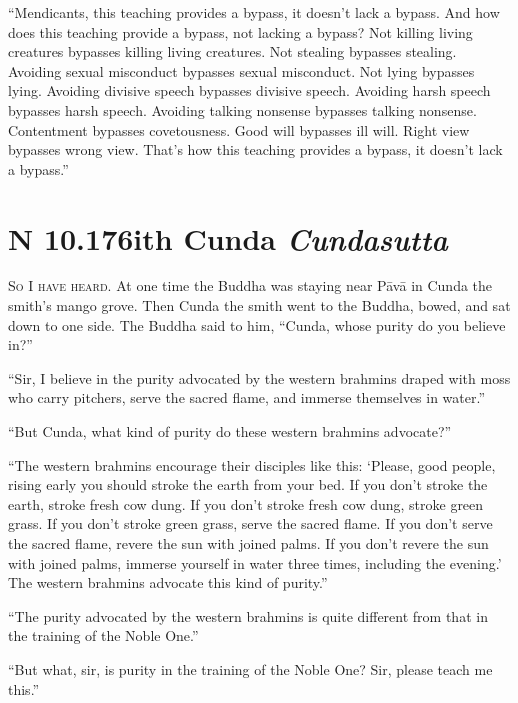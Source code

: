 \documentclass[12pt,openany]{book}%
\newcommand*{\suttatitleacronym}[1]{\smaller[2]{#1}\vspace*{.3em}}
\newcommand*{\suttatitletranslation}[1]{\linebreak{#1}}
\newcommand*{\suttatitleroot}[1]{\linebreak\smaller[2]\itshape{#1}}
\newcommand*{\tocacronym}[1]{\hspace*{-3.3em}{#1}\quad}
\newcommand*{\toctranslation}[1]{#1}
\newcommand*{\tocroot}[1]{(\textit{#1})}
\newcommand*{\scevam}[1]{\textsc{#1}}
\begin{document}
“Mendicants, this teaching provides a bypass, it doesn’t lack a bypass. And how does this teaching provide a bypass, not lacking a bypass? Not killing living creatures bypasses killing living creatures. Not stealing bypasses stealing. Avoiding sexual misconduct bypasses sexual misconduct. Not lying bypasses lying. Avoiding divisive speech bypasses divisive speech. Avoiding harsh speech bypasses harsh speech. Avoiding talking nonsense bypasses talking nonsense. Contentment bypasses covetousness. Good will bypasses ill will. Right view bypasses wrong view. That’s how this teaching provides a bypass, it doesn’t lack a bypass.” 

%
\section*{{\suttatitleacronym AN 10.176}{\suttatitletranslation With Cunda }{\suttatitleroot Cundasutta}}
\addcontentsline{toc}{section}{\tocacronym{AN 10.176} \toctranslation{With Cunda } \tocroot{Cundasutta}}

\scevam{So I have heard. }At one time the Buddha was staying near \textsanskrit{Pāvā} in Cunda the smith’s mango grove. Then Cunda the smith went to the Buddha, bowed, and sat down to one side. The Buddha said to him, “Cunda, whose purity do you believe in?” 

“Sir, I believe in the purity advocated by the western brahmins draped with moss who carry pitchers, serve the sacred flame, and immerse themselves in water.” 

“But Cunda, what kind of purity do these western brahmins advocate?” 

“The western brahmins encourage their disciples like this: ‘Please, good people, rising early you should stroke the earth from your bed. If you don’t stroke the earth, stroke fresh cow dung. If you don’t stroke fresh cow dung, stroke green grass. If you don’t stroke green grass, serve the sacred flame. If you don’t serve the sacred flame, revere the sun with joined palms. If you don’t revere the sun with joined palms, immerse yourself in water three times, including the evening.’ The western brahmins advocate this kind of purity.” 

“The purity advocated by the western brahmins is quite different from that in the training of the Noble One.” 

“But what, sir, is purity in the training of the Noble One? Sir, please teach me this.” 
\end{document}
